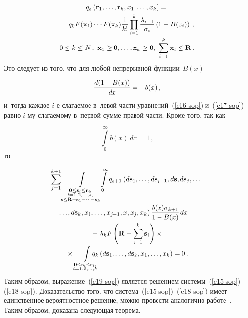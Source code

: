 \begin{multicols}{2}
    \columnbreak
    
    \noindent
  \begin{multline}
  q_k\left( \mathbf{r}_1, \ldots, \mathbf{r}_k, x_1, \ldots, x_k\right) ={}\\[-1pt]
  {}=q_0 
F(\mathbf{x}_1) \cdots F(\mathbf{x}_k) \fr{1}{k!} \prod\limits^k_{i=1} 
\fr{\lambda_{i-1}}{\sigma_i} \left( 1-B(x_i)\right)\,,\\[-1pt]
  0\leq k\leq N\,,\ \mathbf{x}_1\geq \mathbf{0},\ldots , \mathbf{x}_k\geq \mathbf{0},\ 
\sum\limits^k_{i=1} \mathbf{x}_i\leq \mathbf{R}\,.
  \label{e19-sop}
  \end{multline}
    Это следует из того, что для любой непрерывной функции~$B(x)$
    
    \noindent
  $$
  \displaystyle\frac{\displaystyle d(1-B(x))\mathstrut}{\displaystyle dx\mathstrut}=-b(x)\,,
  $$ 
и~тогда каждое $i$-е слагаемое в~левой части уравнений~(\ref{e16-sop})
и~(\ref{e17-sop}) равно $i$-му слагаемому в~первой сумме правой части. 
Кроме того, так как 

\noindent
$$ 
\int\limits_0^\infty b(x)\,dx=1\,,
$$
то

\vspace*{-9pt}

\noindent
\begin{multline*}
\hspace*{-1mm}\sum\limits^{k+1}_{j=1}\int\limits_{\substack{{\mathbf{0}\leq 
\mathbf{s}_i\leq \mathbf{r}_i,}\\[-1pt]  
{i=1,2,\ldots,k,}\\ {\mathbf{s}\leq \mathbf{R}-\mathbf{s}_1-\cdots -\mathbf{s}_k}}}\!\!
\int\limits_0^\infty  
q_{k+1}\left( d\mathbf{s}_1,\ldots, d\mathbf{s}_{j-1}, d\mathbf{s}, d\mathbf{s}_j,\ldots\right.\\[-1pt]
\left.\ldots, d\mathbf{s}_k, x_1,\ldots, x_{j-1}, x, 
x_j, x_k\right)\fr{b(x)\sigma_{k+1}}{1-B(x)}\,dx-{}\\[-1pt]
{}-\lambda_k F\left( \mathbf{R}-\sum\limits^k_{i=1} \mathbf{s}_i\right)\times{}\\[-1pt]
{}\times  
\int\limits_{\substack{{\mathbf{0}\leq \mathbf{s}_i\leq \mathbf{r}_i,}\\[-1pt]  
{i=1,2,\ldots,k}}}\hspace*{-4mm}
q_k\left( d\mathbf{s}_1,\ldots, d\mathbf{s}_k, x_1,\ldots, x_k\right)=0\,.
\end{multline*}
Таким образом, выражение~(\ref{e19-sop}) является решением 
системы~(\ref{e15-sop})--(\ref{e18-sop}). Доказательство того, что 
сис\-те\-ма~(\ref{e15-sop})--(\ref{e18-sop}) имеет единственное вероятностное 
решение, можно провести аналогично работе~\cite{9-sop}. Таким образом, 
доказана следующая теорема.


\end{multicols}
